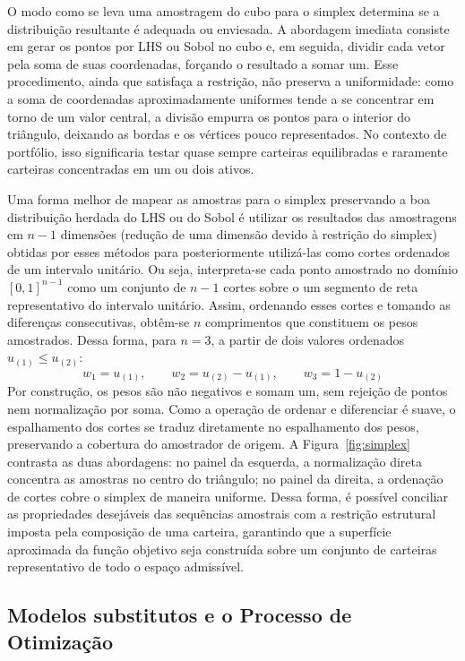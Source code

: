 \documentclass[12pt,a4paper]{article}
\begin{document}
O modo como se leva uma amostragem do cubo para o simplex determina se a distribuição resultante é adequada ou enviesada. A abordagem imediata consiste em gerar os pontos por LHS ou Sobol no cubo e, em seguida, dividir cada vetor pela soma de suas coordenadas, forçando o resultado a somar um. Esse procedimento, ainda que satisfaça a restrição, não preserva a uniformidade: como a soma de coordenadas aproximadamente uniformes tende a se concentrar em torno de um valor central, a divisão empurra os pontos para o interior do triângulo, deixando as bordas e os vértices pouco representados. No contexto de portfólio, isso significaria testar quase sempre carteiras equilibradas e raramente carteiras concentradas em um ou dois ativos.

Uma forma melhor de mapear as amostras para o simplex preservando a boa distribuição herdada do LHS ou do Sobol é utilizar os resultados das amostragens em $n-1$ dimensões (redução de uma dimensão devido à restrição do simplex) obtidas por esses métodos para posteriormente utilizá-las como cortes ordenados de um intervalo unitário. Ou seja, interpreta-se cada ponto amostrado no domínio $[0,1]^{n-1}$ como um conjunto de $n-1$ cortes sobre o um segmento de reta representativo do intervalo unitário. Assim, ordenando esses cortes e tomando as diferenças consecutivas, obtêm-se $n$ comprimentos que constituem os pesos amostrados. Dessa forma, para $n=3$, a partir de dois valores ordenados $u_{(1)} \leq u_{(2)}$:
$$ w_1 = u_{(1)}, \qquad w_2 = u_{(2)} - u_{(1)}, \qquad w_3 = 1 - u_{(2)} $$
Por construção, os pesos são não negativos e somam um, sem rejeição de pontos nem normalização por soma. Como a operação de ordenar e diferenciar é suave, o espalhamento dos cortes se traduz diretamente no espalhamento dos pesos, preservando a cobertura do amostrador de origem. A Figura~\ref{fig:simplex} contrasta as duas abordagens: no painel da esquerda, a normalização direta concentra as amostras no centro do triângulo; no painel da direita, a ordenação de cortes cobre o simplex de maneira uniforme. Dessa forma, é possível conciliar as propriedades desejáveis das sequências amostrais com a restrição estrutural imposta pela composição de uma carteira, garantindo que a superfície aproximada da função objetivo seja construída sobre um conjunto de carteiras representativo de todo o espaço admissível.



\subsection{Modelos substitutos e o Processo de Otimização}
\label{sub:surrogate}
\end{document}
